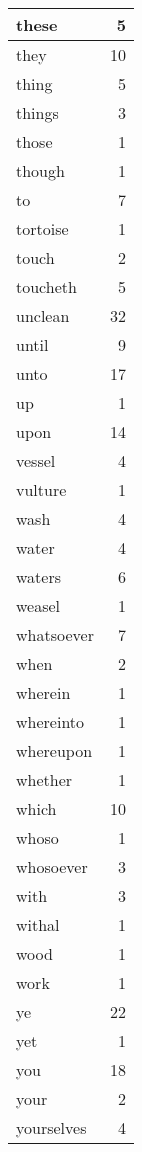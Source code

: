 \begin{center}
\begin{longtable}{l|r}
these & 5 \\ \hline
they & 10 \\ \hline
thing & 5 \\ \hline
things & 3 \\ \hline
those & 1 \\ \hline
though & 1 \\ \hline
to & 7 \\ \hline
tortoise & 1 \\ \hline
touch & 2 \\ \hline
toucheth & 5 \\ \hline
unclean & 32 \\ \hline
until & 9 \\ \hline
unto & 17 \\ \hline
up & 1 \\ \hline
upon & 14 \\ \hline
vessel & 4 \\ \hline
vulture & 1 \\ \hline
wash & 4 \\ \hline
water & 4 \\ \hline
waters & 6 \\ \hline
weasel & 1 \\ \hline
whatsoever & 7 \\ \hline
when & 2 \\ \hline
wherein & 1 \\ \hline
whereinto & 1 \\ \hline
whereupon & 1 \\ \hline
whether & 1 \\ \hline
which & 10 \\ \hline
whoso & 1 \\ \hline
whosoever & 3 \\ \hline
with & 3 \\ \hline
withal & 1 \\ \hline
wood & 1 \\ \hline
work & 1 \\ \hline
ye & 22 \\ \hline
yet & 1 \\ \hline
you & 18 \\ \hline
your & 2 \\ \hline
yourselves & 4 \\ \hline
\end{longtable}
\end{center}



\normalsize



